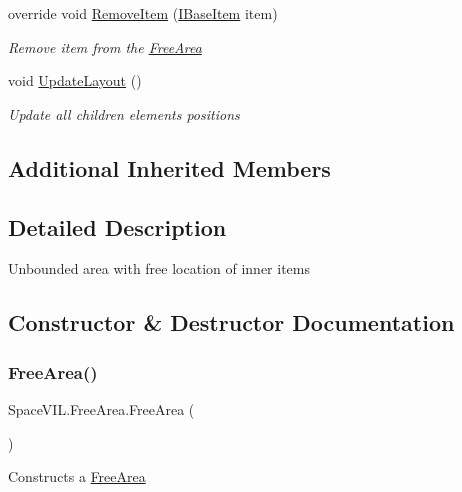 \begin{DoxyCompactItemize}
override void \mbox{\hyperlink{class_space_v_i_l_1_1_free_area_ae9b39df00c0fa786b4072b8e49e3aacc}{Remove\+Item}} (\mbox{\hyperlink{interface_space_v_i_l_1_1_core_1_1_i_base_item}{I\+Base\+Item}} item)
\begin{DoxyCompactList}\small\item\em Remove item from the \mbox{\hyperlink{class_space_v_i_l_1_1_free_area}{Free\+Area}} \end{DoxyCompactList}\item 
void \mbox{\hyperlink{class_space_v_i_l_1_1_free_area_a88f3dc2645275f25f2fae769e7a1423a}{Update\+Layout}} ()
\begin{DoxyCompactList}\small\item\em Update all children elements positions \end{DoxyCompactList}\end{DoxyCompactItemize}
\subsection*{Additional Inherited Members}


\subsection{Detailed Description}
Unbounded area with free location of inner items 



\subsection{Constructor \& Destructor Documentation}
\mbox{\label{class_space_v_i_l_1_1_free_area_a66c2dcb40e9cacde8f342c20a5193d96}} 
\subsubsection{\texorpdfstring{Free\+Area()}{FreeArea()}}
{\footnotesize\ttfamily Space\+V\+I\+L.\+Free\+Area.\+Free\+Area (\begin{DoxyParamCaption}{ }\end{DoxyParamCaption})}



Constructs a \mbox{\hyperlink{class_space_v_i_l_1_1_free_area}{Free\+Area}} 



